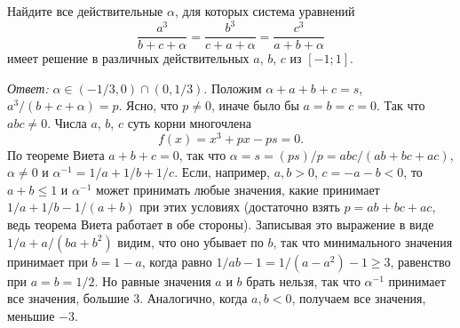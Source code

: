 Найдите все действительные $\alpha$, для которых система уравнений
\[
    \frac{a^3}{b + c + \alpha}
=
    \frac{b^3}{c + a + \alpha}
=
    \frac{c^3}{a + b + \alpha}
\]
имеет решение в различных действительных $a$, $b$, $c$ из $[-1; 1]$.


\solution
\emph{Ответ:} $\alpha \in (-1/3, 0) \cap (0, 1/3)$.
Положим $\alpha + a + b + c = s$, $a^3 / (b + c + \alpha) = p$.
Ясно, что $p \ne 0$, иначе было бы $a = b = c = 0$.
Так что $a b c \ne 0$.
Числа $a$, $b$, $c$ суть корни многочлена \[f(x)=x^3+px-ps=0.\]
По теореме Виета $a + b + c = 0$, так что
$\alpha = s = (p s) / p = a b c / (a b + b c + a c)$,
$\alpha \ne 0$
и
$\alpha^{-1} = 1 / a + 1 / b + 1 / c$.
Если, например, $a, b > 0$, $c = -a - b < 0$, то
$a + b \leq 1$ и $\alpha^{-1}$
может принимать любые значения, какие принимает
$1 / a + 1 / b - 1 / (a + b)$
при этих условиях
(достаточно взять $p = a b + b c + a c$, ведь теорема Виета работает в обе
стороны).
Записывая это выражение в виде $1 / a + a / (b a + b^2)$ видим, что оно убывает
по $b$, так что минимального значения принимает при $b = 1 - a$, когда равно
$1 / a b - 1 = 1 / (a - a^2) - 1 \geq 3$, равенство при $a = b = 1 / 2$.
Но равные значения $a$ и $b$ брать нельзя, так что $\alpha^{-1}$ принимает все
значения, большие $3$.
Аналогично, когда $a, b < 0$, получаем все значения, меньшие $-3$.
